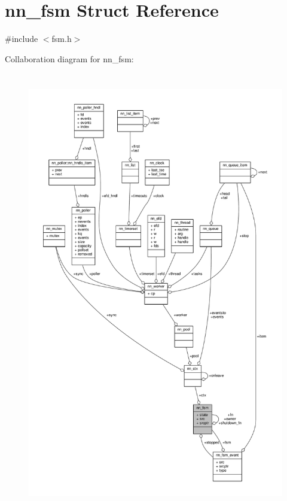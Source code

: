 \hypertarget{structnn__fsm}{}\section{nn\+\_\+fsm Struct Reference}
\label{structnn__fsm}


{\ttfamily \#include $<$fsm.\+h$>$}



Collaboration diagram for nn\+\_\+fsm\+:\nopagebreak
\begin{figure}[H]
\begin{center}
\leavevmode
\includegraphics[height=550pt]{structnn__fsm__coll__graph}
\end{center}
\end{figure}
